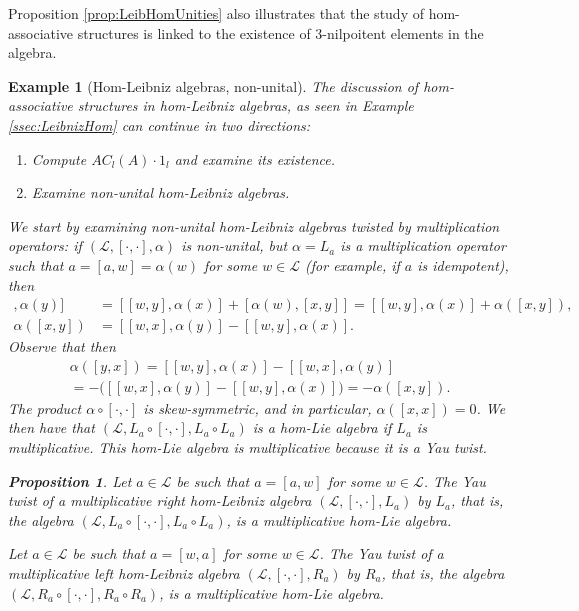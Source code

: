 \documentclass[12pt]{article}
\newtheorem{proposition}[theorem]{Proposition}
\newtheorem{example}[theorem]{Example}
\begin{document}
     Proposition \ref{prop:LeibHomUnities} also illustrates that the study of hom-associative structures is linked to the existence of $3$-nilpoitent elements in the algebra.
		
		\begin{example}[Hom-Leibniz algebras, non-unital]		
			The discussion of hom-associ\-ative structures in hom-Leibniz algebras, as seen in Example \ref{ssec:LeibnizHom} can continue in two directions:
			\begin{enumerate}
				\item Compute $AC_l(A)\cdot 1_l$ and examine its existence.
				\item Examine non-unital hom-Leibniz algebras.
			\end{enumerate}
			
			We start by examining non-unital hom-Leibniz algebras twisted by multiplication operators: if $(\mathcal{L},[\cdot,\cdot],\alpha)$ is non-unital, but $\alpha=L_a$ is a multiplication operator such that $a=[a,w]=\alpha(w)$ for some $w\in\mathcal{L}$ (for example, if $a$ is idempotent), then
			\begin{align*}
				[[w,x],\alpha(y)]&=[[w,y],\alpha(x)]+[\alpha(w),[x,y]]=[[w,y],\alpha(x)]+\alpha([x,y]),\\
				\alpha([x,y])&=[[w,x],\alpha(y)]-[[w,y],\alpha(x)].
			\end{align*}
			Observe that then
			\begin{multline*}
				\alpha([y,x])=[[w,y],\alpha(x)]-[[w,x],\alpha(y)]\\
				=-\big([[w,x],\alpha(y)]-[[w,y],\alpha(x)]\big)=-\alpha([x,y]).
			\end{multline*}
			The product $\alpha\circ[\cdot,\cdot]$ is skew-symmetric, and in particular, $\alpha([x,x])=0$. We then have that $(\mathcal{L},L_a\circ [\cdot,\cdot],L_a\circ L_a)$ is a hom-Lie algebra if $L_a$ is multiplicative. This hom-Lie algebra is multiplicative because it is a Yau twist.
			
			\begin{proposition}\label{prop:HLeibYauTwist}
				Let $a\in\mathcal{L}$ be such that $a=[a,w]$ for some $w\in\mathcal{L}$. The Yau twist of a multiplicative right hom-Leibniz algebra $(\mathcal{L},[\cdot,\cdot],L_a)$ by $L_a$, that is, the algebra $(\mathcal{L},L_a\circ [\cdot,\cdot],L_a\circ L_a)$, is a multiplicative hom-Lie algebra.
				
				Let $a\in\mathcal{L}$ be such that $a=[w,a]$ for some $w\in\mathcal{L}$. The Yau twist of a multiplicative left hom-Leibniz algebra $(\mathcal{L},[\cdot,\cdot],R_a)$ by $R_a$, that is, the algebra $(\mathcal{L},R_a\circ[\cdot,\cdot],R_a\circ R_a)$, is a multiplicative hom-Lie algebra.
			\end{proposition}
			

\end{example}
\end{document}
